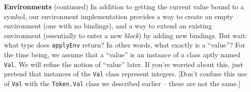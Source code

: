 \begin{minipage}[t]{\sw}
\slidenumber
\LARGE
{\bf Environments} (continued)\exx
In addition to getting the current value bound to a symbol,
our environment implementation provides
a way to create an empty environment (one with no bindings),
and a way to extend an existing environment
(essentially to enter a new {\em block})
by adding new bindings.\exx
But wait: what type does \verb'applyEnv' return?
In other words, what exactly is a ``value''?
For the time being, we assume that a ``value'' is an instance
of a class aptly named \verb'Val'.
We will refine the notion of ``value'' later.
If you're worried about this,
just pretend that instances of the \verb'Val' class
represent integers.
[Don't confuse this use of \verb'Val'
with the \verb'Token.Val' class we described earlier --
these are not the same.]
\end{minipage}
\clearpage
